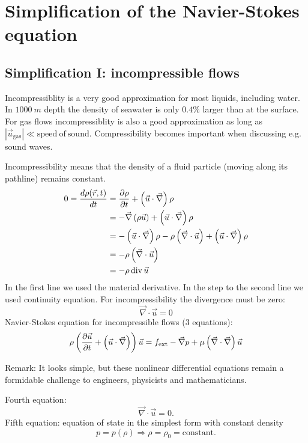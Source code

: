 \section{Simplification of the Navier-Stokes equation}

\subsection{Simplification I: incompressible flows}
Incompressiblity is a very good approximation for most liquids, including water. In $\SI{1000}{m}$ depth the density of seawater is only $0.4\%$ larger than at the surface. For gas flows incompressiblity is also a good approximation as long as $|\vec{u}_\mathrm{gas}| \ll \mathrm{speed\ of\ sound}$. Compressibility becomes important when discussing e.g. sound waves.

Incompressibility means that the density of a fluid particle (moving along its pathline) remains constant.
\begin{align}
0 = \frac{d \rho(\vec{r},t)}{d t} &= \frac{\partial \rho}{\partial t}+\left(\vec{u}\cdot\vec{\nabla}\right)\rho\\
&= -\vec{\nabla}\left(\rho\vec{u}\right)+\left(\vec{u}\cdot\vec{\nabla}\right)\rho \\
&= -\left(\vec{u}\cdot\vec{\nabla}\right)\rho - \rho\left(\vec{\nabla}\cdot\vec{u}\right) + \left(\vec{u}\cdot\vec{\nabla}\right)\rho\\
&= -\rho\left(\vec{\nabla}\cdot\vec{u}\right)\\
&= -\rho\, \mathrm{div}\, \vec{u}
\end{align}
In the first line we used the material derivative. In the step to the second line we used continuity equation. For incompressibility the divergence must be zero:
\begin{equation}
\vec{\nabla}\cdot\vec{u} = 0
\end{equation}
Navier-Stokes equation for incompressible flows (3 equations):
\begin{equation}
\rho\left(\frac{\partial \vec{u}}{\partial t}+\left(\vec{u}\cdot\vec{\nabla}\right)\right)\vec{u} = f_\mathrm{ext}-\vec{\nabla}p+\mu\left(\vec{\nabla}\cdot\vec{\nabla}\right)\vec{u}
\end{equation}
\begin{framed}
Remark: It looks simple, but these nonlinear differential equations remain a formidable challenge to engineers, physicists and mathematicians.
\end{framed}
Fourth equation:
\begin{equation}
\vec{\nabla}\cdot\vec{u}=0.   
\end{equation}
Fifth equation: equation of state in the simplest form with constant density
\begin{equation}
p=p(\rho) \Rightarrow \rho=\rho_0=\mathrm{constant}.
\end{equation}


